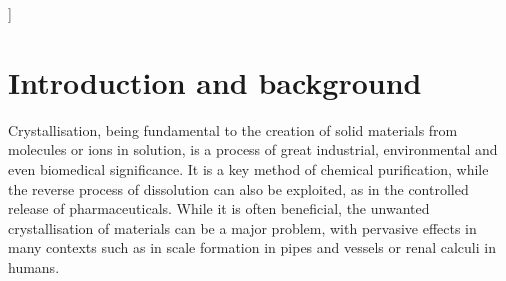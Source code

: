 \documentclass[twoside,twocolumn,9pt]{article}
\begin{document}
  ]

\renewcommand*\rmdefault{bch}\normalfont\upshape
\rmfamily
\section*{}
\vspace{-1cm}








\section{Introduction and background}
Crystallisation, being fundamental to the creation of solid materials from molecules or ions in solution, is a process of great industrial, environmental and even biomedical significance. It is a key method of chemical purification, while the reverse process of dissolution can also be exploited, as in the controlled release of pharmaceuticals.\cite{Amabilino2014} While it is often beneficial, the unwanted crystallisation of materials can be a major problem, with pervasive effects in many contexts such as in scale formation in pipes and vessels or renal calculi in humans.
\end{document}
